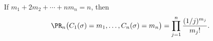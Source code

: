 \begin{thm}[Cauchy]\label{thm:Cauchy}
If $m_1+2m_2+\cdots+nm_n=n$, then
\[
\PR_n \big( C_1(\sigma)=m_1,\ldots,C_n(\sigma)=m_n \big) = \prod_{j=1}^n \frac{(1/j)^{m_j}}{m_j!}.
\]
\end{thm}
